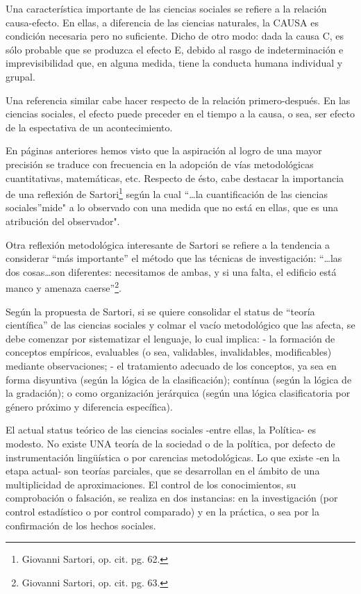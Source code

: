 \documentclass[
]{book}
\begin{document}
Una característica importante de las ciencias sociales se refiere a la relación causa-efecto. En ellas, a diferencia de las ciencias naturales, la CAUSA es condición necesaria pero no suficiente. Dicho de otro modo: dada la causa C, es sólo probable que se produzca el efecto E, debido al rasgo de indeterminación e imprevisibilidad que, en alguna medida, tiene la conducta humana individual y grupal.

Una referencia similar cabe hacer respecto de la relación primero-después. En las ciencias sociales, el efecto puede preceder en el tiempo a la causa, o sea, ser efecto de la espectativa de un acontecimiento.

En páginas anteriores hemos visto que la aspiración al logro de una mayor precisión se traduce con frecuencia en la adopción de vías metodológicas cuantitativas, matemáticas, etc. Respecto de ésto, cabe destacar la importancia de una reflexión de Sartori\footnote{Giovanni Sartori, op. cit. pg. 62.} según la cual ``\ldots la cuantificación de las ciencias sociales''mide" a lo observado con una medida que no está en ellas, que es una atribución del observador".

Otra reflexión metodológica interesante de Sartori se refiere a la tendencia a considerar ``más importante'' el método que las técnicas de investigación: ``\ldots las dos cosas\ldots son diferentes: necesitamos de ambas, y si una falta, el edificio está manco y amenaza caerse''\footnote{Giovanni Sartori, op. cit. pg. 63.}.

Según la propuesta de Sartori, si se quiere consolidar el status de ``teoría científica'' de las ciencias sociales y colmar el vacío metodológico que las afecta, se debe comenzar por sistematizar el lenguaje, lo cual implica: - la formación de conceptos empíricos, evaluables (o sea, validables, invalidables, modificables) mediante observaciones; - el tratamiento adecuado de los conceptos, ya sea en forma disyuntiva (según la lógica de la clasificación); contínua (según la lógica de la gradación); o como organización jerárquica (según una lógica clasificatoria por género próximo y diferencia específica).

El actual status teórico de las ciencias sociales -entre ellas, la Política- es modesto. No existe UNA teoría de la sociedad o de la política, por defecto de instrumentación lingüística o por carencias metodológicas. Lo que existe -en la etapa actual- son teorías parciales, que se desarrollan en el ámbito de una multiplicidad de aproximaciones. El control de los conocimientos, su comprobación o falsación, se realiza en dos instancias: en la investigación (por control estadístico o por control comparado) y en la práctica, o sea por la confirmación de los hechos sociales.
\end{document}
